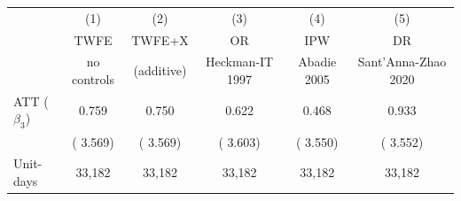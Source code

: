 \begin{tabular}{l c c c c c}
\toprule
 & (1) & (2) & (3) & (4) & (5) \\
 & TWFE & TWFE+X & OR & IPW & DR \\
 & no controls & (additive) & Heckman-IT 1997 & Abadie 2005 & Sant'Anna-Zhao 2020 \\
\midrule
ATT ($\beta_3$) &     0.759 &     0.750 &     0.622 &     0.468 &     0.933 \\
  & (    3.569) & (    3.569) & (    3.603) & (    3.550) & (    3.552) \\
\midrule
Unit-days &    33,182 &    33,182 &    33,182 &    33,182 &    33,182 \\
\bottomrule
\end{tabular}
